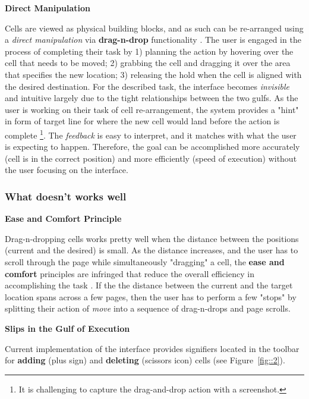 \documentclass[12pt,letterpaper]{article}
\begin{document}
\textbf{Direct Manipulation}

Cells are viewed as physical building blocks, and as such can be re-arranged using a \textit{direct manipulation} via \textbf{drag-n-drop} functionality \cite{frohlich1997direct}. The user is engaged in the process of completing their task by 1) planning the action by hovering over the cell that needs to be moved; 2) grabbing the cell and dragging it over the area that specifies the new location; 3) releasing the hold when the cell is aligned with the desired destination. For the described task, the interface becomes \textit{invisible} and intuitive largely due to the tight relationships between the two gulfs. As the user is working on their task of cell re-arrangement, the system provides a "hint" in form of target line for where the new cell would land before the action is complete \footnote{It is challenging to capture the drag-and-drop action with a screenshot.}. The \textit{feedback} is easy to interpret, and it matches with what the user is expecting to happen. Therefore, the goal can be accomplished more accurately (cell is in the correct position) and more efficiently (speed of execution) without the user focusing on the interface.



\subsubsection*{What doesn't works well}

\textbf{Ease and Comfort Principle}

Drag-n-dropping cells works pretty well when the distance between the positions (current and the desired) is small. As the distance increases, and the user has to scroll through the page while simultaneously "dragging" a cell, the \textbf{ease and comfort} principles are infringed that reduce the overall efficiency in accomplishing the task \cite{story1998universal}. If the the distance between the current and the target location spans across a few pages, then the user has to perform a few "stops" by splitting their action of \textit{move} into a sequence of drag-n-drops and page scrolls. 

\textbf{Slips in the Gulf of Execution} 

Current implementation of the interface provides signifiers located in the toolbar for \textbf{adding} (plus sign) and \textbf{deleting} (scissors icon) cells (see Figure~\ref{fig::2}). 
\end{document}
